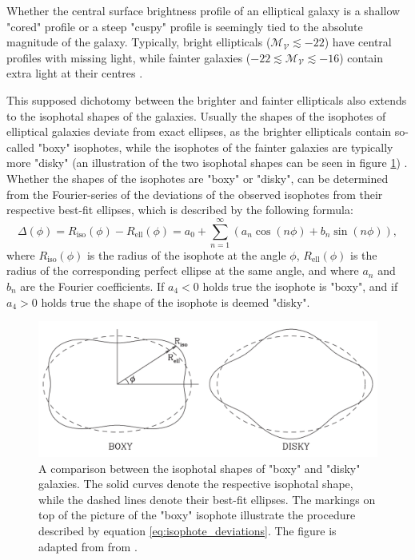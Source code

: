 \documentclass[english, twoside]{HYgradu}
\begin{document}
Whether the central surface brightness profile of an elliptical galaxy is a shallow "cored" profile or a steep "cuspy" profile is seemingly tied to the absolute magnitude of the galaxy. Typically, bright ellipticals ($\mathcal{M_V} \lesssim -22$) have central profiles with missing light, while fainter galaxies ($-22 \lesssim \mathcal{M_V} \lesssim -16$) contain extra light at their centres \citep{Kormendy2009}. 

This supposed dichotomy between the brighter and fainter ellipticals also extends to the isophotal shapes of the galaxies. Usually the shapes of the isophotes of elliptical galaxies deviate from exact ellipses, as the brighter ellipticals contain so-called "boxy" isophotes, while the isophotes of the fainter galaxies are typically more "disky" (an illustration of the two isophotal shapes can be seen in figure \ref{figure:isophotes}) \citep{GalaxyFormationAndEvo2010}. Whether the shapes of the isophotes are "boxy" or "disky", can be determined from the Fourier-series of the deviations of the observed isophotes from their respective best-fit ellipses, which is described by the following formula:
\begin{equation}
\Delta (\phi) = R_\mathrm{iso}(\phi) - R_\mathrm{ell}(\phi) = a_0 + \displaystyle\sum^\infty_{n=1} (a_n \cos(n\phi) + b_n \sin(n\phi)), \label{eq:isophote_deviations}
\end{equation}
where $R_\mathrm{iso}(\phi)$ is the radius of the isophote at the angle $\phi$, $R_\mathrm{ell}(\phi)$ is the radius of the corresponding perfect ellipse at the same angle, and where $a_n$ and $b_n$ are the Fourier coefficients. If $a_4 < 0$ holds true the isophote is "boxy", and if $a_4 > 0$ holds true the shape of the isophote is deemed "disky".

\begin{figure}
	\centering
	\includegraphics[width=\textwidth]{boxy_and_disky_GFE.png}
	\caption{A comparison between the isophotal shapes of "boxy" and "disky" galaxies. The solid curves denote the respective isophotal shape, while the dashed lines denote their best-fit ellipses. The markings on top of the picture of the "boxy" isophote illustrate the procedure described by equation \ref{eq:isophote_deviations}. The figure is adapted from from \cite{GalaxyFormationAndEvo2010}.}
	\label{figure:isophotes}
\end{figure}
\end{document}
